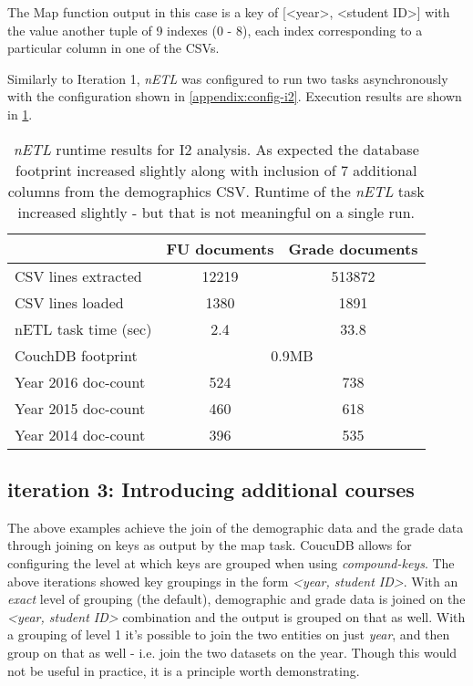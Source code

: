 The Map function output in this case is a key of [<year>, <student ID>] with the value another tuple of 9 indexes (0 - 8), each index corresponding to a particular column in one of the CSVs.

Similarly to Iteration 1, \textit{nETL} was configured to run two tasks asynchronously with the configuration shown in \ref{appendix:config-i2}. Execution results are shown in \ref{i2-results}.

\begin{table}[]
    \centering
    \caption{\textit{nETL} runtime results for I2 analysis. As expected the database footprint increased slightly along with inclusion of 7 additional columns from the demographics CSV. Runtime of the \textit{nETL} task increased slightly - but that is not meaningful on a single run.}
    \label{i2-results}
    \begin{tabular}{lcc}
                             & FU documents              & Grade documents \\ \hline
        CSV lines extracted  & 12219                     & 513872          \\
        CSV lines loaded     & 1380                      & 1891            \\
        nETL task time (sec) & 2.4                       & 33.8            \\
        CouchDB footprint    & \multicolumn{2}{c}{0.9MB}                   \\
        Year 2016 doc-count  & 524                       & 738             \\
        Year 2015 doc-count  & 460                       & 618             \\
        Year 2014 doc-count  & 396                       & 535             \\
    \end{tabular}
\end{table}


\subsection{iteration 3: Introducing additional courses}
The above examples achieve the join of the demographic data and the grade data through joining on keys as output by the map task. CoucuDB allows for configuring the level at which keys are grouped when using \textit{compound-keys}. The above iterations showed key groupings in the form \textit{<year, student ID>}. With an \textit{exact} level of grouping (the default), demographic and grade data is joined on the \textit{<year, student ID>} combination and the output is grouped on that as well. With a grouping of level 1 it's possible to join the two entities on just \textit{year}, and then group on that as well - i.e. join the two datasets on the year. Though this would not be useful in practice, it is a principle worth demonstrating.

